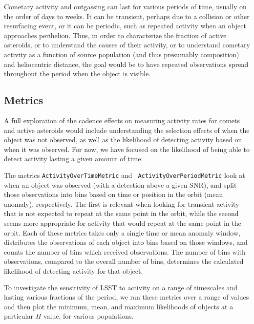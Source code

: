 Cometary activity and outgassing can last for various periods of time,
usually on the order of days to weeks. It can be transient, perhaps
due to a collision or other resurfacing event, or it can be periodic,
such as repeated activity when an object approaches perihelion. Thus,
in order to characterize the fraction of active asteroids, or to
understand the causes of their activity, or to understand cometary
activity as a function of source population (and thus presumably
composition) and heliocentric distance, the goal would be to have
repeated observations spread throughout the period when the object is visible.



\subsection{Metrics}
\label{sec:\secname:metrics}

A full exploration of the cadence effects on measuring activity rates
for comets and active asteroids would include understanding the
selection effects of when the object was not observed, as well as the
likelihood of detecting activity based on when it was observed. For
now, we have focused on the likelihood of being able to detect
activity lasting a given amount of time.

The metrics {\tt ActivityOverTimeMetric} and {\tt
  ActivityOverPeriodMetric} look at when an object was observed (with
a detection above a given SNR), and
split those observations into bins based on time or position in the
orbit (mean anomaly), respectively. The first is relevant when looking
for transient activity that is not expected to repeat at the same
point in the orbit, while the second seems more appropriate for
activity that would repeat at the same point in the orbit. Each of
these metrics takes only a single time or mean anomaly window, distributes
the observations of each object into bins based on those windows, and
counts the number of bins which received observations. The number of
bins with observations, compared to the overall number of bins,
determines the calculated likelihood of detecting activity for that
object.

To investigate the sensitivity of LSST to activity on a range of
timescales and lasting various fractions of the period, we ran these
metrics over a range of values and then plot the minimum, mean, and
maximum likelihoods of objects at a particular $H$ value, for various populations.


